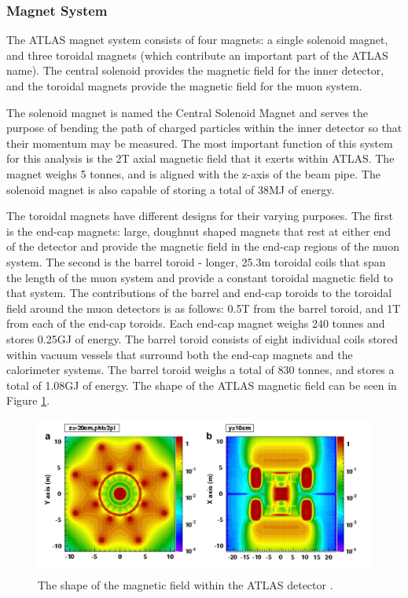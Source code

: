 \documentclass[12pt,a4paper,epsf,portrait,times,epsfig]{article}
\begin{document}
		\subsubsection{Magnet System}
		
		The ATLAS magnet system consists of four magnets: a single solenoid magnet, and three toroidal magnets (which contribute an important part of the ATLAS name). The central solenoid provides the magnetic field for the inner detector, and the toroidal magnets provide the magnetic field	for the muon system. \par

		The solenoid magnet is named the Central Solenoid Magnet and serves the purpose of bending the path of charged particles within the inner detector so that their momentum	may be measured. The most important function of this system for this analysis is the 2T	axial magnetic field that it exerts within ATLAS. The magnet weighs 5 tonnes, and is aligned with the z-axis of the beam pipe. The solenoid magnet is also capable of storing	a total of 38MJ of energy. \par
		
		The toroidal magnets have different designs for their varying purposes. The first is the end-cap magnets: large, doughnut shaped magnets that rest at either end of the detector and provide the magnetic field in the end-cap regions of the muon system. The second is the barrel toroid - longer, 25.3m toroidal coils that span the length of the muon system
		and provide a constant toroidal magnetic field to that system. The contributions of the barrel and end-cap toroids to the toroidal field around the muon detectors is as follows: 0.5T from the barrel toroid, and 1T from each of the end-cap toroids. Each end-cap magnet weighs 240 tonnes and stores 0.25GJ of energy. The barrel toroid consists of eight
		individual coils stored within vacuum vessels that surround both the end-cap magnets and the calorimeter systems. The barrel toroid weighs a total of 830 tonnes, and stores a total of 1.08GJ of energy. The shape of the ATLAS magnetic field can be seen in Figure \ref{Fig:CernMagneticField}. 
		\cite{ATLAS-TDR-01, ATLAS-TDR-02, Article:ATLASDesignPaper}
		
		\begin{figure}
			\centering
			\includegraphics[scale=0.4]{Magnetic_Field}
			\caption{The shape of the magnetic field within the ATLAS detector \cite{Article:CernMagnets}. }
			\label{Fig:CernMagneticField}
		\end{figure}
		
\end{document}
